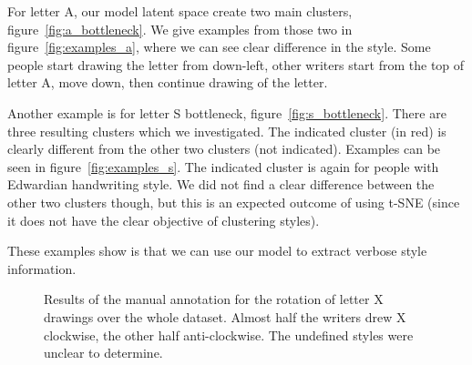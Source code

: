   \par For letter A, our model latent space create two main clusters, figure~\ref{fig:a_bottleneck}. We give examples from those two in figure~\ref{fig:examples_a}, where we can see clear difference in the style. Some people start drawing the letter from down-left, other writers start from the top of letter A, move down, then continue drawing of the letter.

  \par Another example is for letter S bottleneck, figure~\ref{fig:s_bottleneck}. There are three resulting clusters which we investigated. The indicated cluster (in red) is clearly different from the other two clusters (not indicated). Examples can be seen in figure~\ref{fig:examples_s}. The indicated cluster is again for people with Edwardian handwriting style. We did not find a clear difference between the other two clusters though, but this is an expected outcome of using t-SNE (since it does not have the clear objective of clustering styles).

  \par These examples show is that we can use our model to extract verbose style information.
  \begin{figure}[htbp!]
      \centering
      \caption{Results of the manual annotation for the rotation of letter X drawings over the whole dataset. Almost half the writers drew X clockwise, the other half anti-clockwise. The undefined styles were unclear to determine.}
      \label{fig:x_rotation}
  \end{figure}

